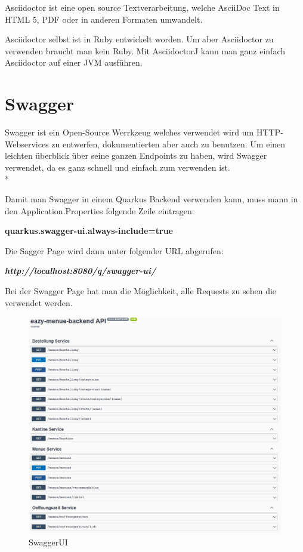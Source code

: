 Asciidoctor ist eine open source Textverarbeitung, welche AsciiDoc Text in HTML 5, PDF oder in anderen Formaten umwandelt.

Asciidoctor selbst ist in Ruby entwickelt worden. Um aber Asciidoctor zu verwenden braucht man kein Ruby. Mit AsciidoctorJ
kann man ganz einfach Asciidoctor auf einer JVM ausführen.

\pagebreak

\section{Swagger}
\author{David Ignjatovic} 

Swagger ist ein Open-Source Werrkzeug welches verwendet wird um HTTP-Webservices zu entwerfen, dokumentierten aber auch zu benutzen. Um einen leichten überblick über seine 
ganzen Endpoints zu haben, wird Swagger verwendet, da es ganz schnell und einfach zum verwenden ist. \\*

Damit man Swagger in einem Quarkus Backend verwenden kann, muss mann in den Application.Properties folgende Zeile eintragen:

\textbf{quarkus.swagger-ui.always-include=true}

Die Sagger Page wird dann unter folgender URL abgerufen: 

\textbf{\textit{http://localhost:8080/q/swagger-ui/ }}

Bei der Swagger Page hat man die Möglichkeit, alle Requests zu sehen die verwendet werden.

\begin{figure}[htp]
    \author{David Ignjatovic}
    \centering
    \includegraphics[scale=0.60]{pics/swagger.jpg}
    \caption{SwaggerUI}
    \label{fig:impl:swagger}
\end{figure}

